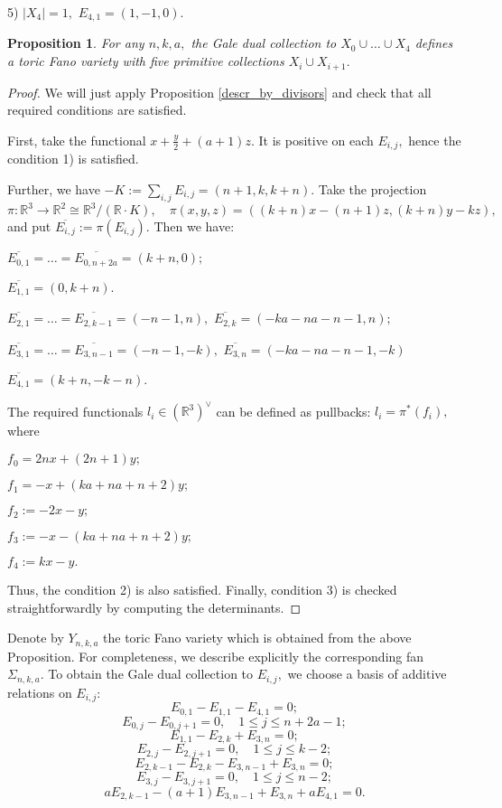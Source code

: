 \documentclass[11pt,leqno]{amsart}
\newtheorem{prop}[theo]{Proposition}
\numberwithin{equation}{section}
\def\R{\mathbb{R}}
\begin{document}
5) $|X_4|=1,$ $E_{4,1}=(1,-1,0).$

\begin{prop}For any $n,k,a,$ the Gale dual collection to $X_0\cup\dots\cup X_4$ defines
a toric Fano variety with five primitive collections $X_i\cup X_{i+1}.$\end{prop}

\begin{proof}We will just apply Proposition \ref{descr_by_divisors} and check that all required conditions are satisfied.

First, take the functional $x+\frac{y}2+(a+1)z.$ It is positive on each $E_{i,j},$ hence the condition 1) is satisfied.

Further, we have $-K:=\sum\limits_{i,j}E_{i,j}=(n+1,k,k+n).$ Take the projection
$$\pi:\R^3\to\R^2\cong\R^3/(\R\cdot K),\quad\pi(x,y,z)=\left(\left(k+n\right)x-\left(n+1\right)z,\left(k+n\right)y-kz\right),$$
and put $\overline{E_{i,j}}:=\pi\left(E_{i,j}\right).$ Then we have:

$\overline{E_{0,1}}=\dots=\overline{E_{0,n+2a}}=(k+n,0);$

$\overline{E_{1,1}}=(0,k+n).$

$\overline{E_{2,1}}=\dots=\overline{E_{2,k-1}}=(-n-1,n),$ $\overline{E_{2,k}}=(-ka-na-n-1,n);$

$\overline{E_{3,1}}=\dots=\overline{E_{3,n-1}}=(-n-1,-k),$ $\overline{E_{3,n}}=(-ka-na-n-1,-k)$

$\overline{E_{4,1}}=(k+n,-k-n).$

The required functionals $l_i\in\left(\R^3\right)^{\vee}$ can be defined as pullbacks: $l_i=\pi^*\left(f_i\right),$ where

$f_0=2nx+(2n+1)y;$

$f_1=-x+(ka+na+n+2)y;$

$f_2:=-2x-y;$

$f_3:=-x-(ka+na+n+2)y;$

$f_4:=kx-y.$

Thus, the condition 2) is also satisfied. Finally, condition 3) is checked straightforwardly by computing the determinants.
\end{proof}

Denote by $Y_{n,k,a}$ the toric Fano variety which is obtained from the above Proposition.
For completeness, we describe explicitly the corresponding fan $\Sigma_{n,k,a}.$ To obtain the Gale dual collection to $E_{i,j},$
we choose a basis of additive relations on $E_{i,j}:$
$$E_{0,1}-E_{1,1}-E_{4,1}=0;$$
$$E_{0,j}-E_{0,j+1}=0,\quad 1\leq j\leq n+2a-1;$$
$$E_{1,1}-E_{2,k}+E_{3,n}=0;$$
$$E_{2,j}-E_{2,j+1}=0,\quad 1\leq j\leq k-2;$$
$$E_{2,k-1}-E_{2,k}-E_{3,n-1}+E_{3,n}=0;$$
$$E_{3,j}-E_{3,j+1}=0,\quad 1\leq j\leq n-2;$$
$$aE_{2,k-1}-(a+1)E_{3,n-1}+E_{3,n}+aE_{4,1}=0.$$
\end{document}
